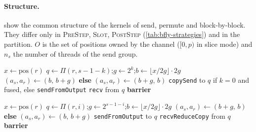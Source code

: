 \paragraph{Structure.}
 show the common structure of the kernels of send, permute and block-by-block.
They differ only in \textsc{PreStep}, \textsc{Slot}, \textsc{PostStep} (\cref{tab:bfly-strategies}) and in the partition.
$O$ is the set of positions owned by the channel ($[0,p)$ in slice mode) and $n_s$ the number of threads of the send group.

\begin{algorithm}[t]
\caption{\bine{} allgather, kernel of one channel.}
\label{alg:bfly-allgather}
\begin{algorithmic}[1]
\State {}
\State $x\gets\mathrm{pos}(r)$
  \State $q\gets\Pi(r,s-1-k)$;\quad $g\gets2^k$;\quad $b\gets\lfloor x/2g\rfloor\cdot2g$
   $(a_s,a_r)\gets(b,\,b+g)$ \textbf{else} $(a_s,a_r)\gets(b+g,\,b)$ \EndIf
    \For{each transfer of the slots \Call{Slot}{$y$}, $y\in[a_s,a_s+g)\cap O$}
      \State \texttt{copySend} to $q$ if $k=0$ and fused, else \texttt{sendFromOutput}
    \EndFor
  \Else{}
    \For{each transfer of the slots \Call{Slot}{$y$}, $y\in[a_r,a_r+g)\cap O$}
      \State \texttt{recv} from $q$
    \EndFor
  \EndIf
  \State \textbf{barrier}
\EndFor
\State {}
\end{algorithmic}
\end{algorithm}

\begin{algorithm}[t]
\caption{\bine{} reduce-scatter, kernel of one channel.}
\label{alg:bfly-reducescatter}
\begin{algorithmic}[1]
\State {}
\State $x\gets\mathrm{pos}(r)$
  \State $q\gets\Pi(r,i)$;\quad $g\gets2^{s-1-i}$;\quad $b\gets\lfloor x/2g\rfloor\cdot2g$
   $(a_s,a_r)\gets(b+g,\,b)$ \textbf{else} $(a_s,a_r)\gets(b,\,b+g)$ \EndIf
    \For{each transfer of the slots \Call{Slot}{$y$}, $y\in[a_s,a_s+g)\cap O$}
      \State \texttt{sendFromOutput} to $q$
    \EndFor
  \Else{}
    \For{each transfer of the slots \Call{Slot}{$y$}, $y\in[a_r,a_r+g)\cap O$}
      \State \texttt{recvReduceCopy} from $q$ 
    \EndFor
  \EndIf
  \State \textbf{barrier}
\EndFor
\State {}
\end{algorithmic}
\end{algorithm}

